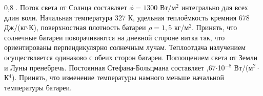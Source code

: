 \begin{enumerate}
    0,8 . Поток света от Солнца составляет $\phi=1300$ Вт/м$^2$  интегрально для всех длин волн. Начальная 
    температура 327 К, удельная теплоёмкость кремния 678 Дж/(кг$\cdot$К), поверхностная плотность батареи $\rho=1,5$ кг/м$^2$. 
    Принять, что солнечные батареи поворачиваются на дневной стороне витка так, что ориентированы перпендикулярно 
    солнечным лучам. Теплоотдача излучением осуществляется одинаково с обеих сторон батареи. Поглощением света 
    от Земли и Луны пренебречь. Постоянная Стефана-Больцмана составляет ,67$\cdot$10$^{-8}$ Вт/(м$^2\cdot$К$^4$). 
    Принять, что изменение температуры намного меньше начальной температуры батареи.
\end{enumerate}
